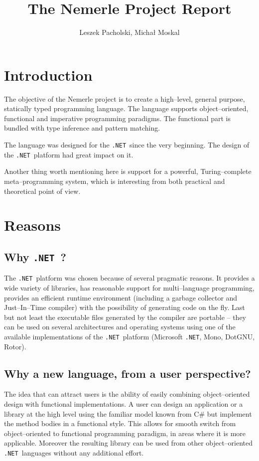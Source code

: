 \documentclass{article}
\title{The Nemerle Project Report}
\author{Leszek Pacholski, Micha{\l} Moskal}
\newcommand{\net}[0]{{\tt .NET}}
\begin{document}
\maketitle

\section{Introduction}

The objective of the Nemerle project is to create a high--level,
general purpose, statically typed programming language. The language supports
object--oriented, functional and imperative programming paradigms.
The functional part is bundled with type inference and pattern matching.

The language was designed for the \net\ since the very beginning.
The design of the \net\ platform had great impact on it.

Another thing worth mentioning here is support for a powerful,
Turing--complete meta--programming system, which is interesting from
both practical and theoretical point of view.

\section{Reasons}

\subsection{Why \net\ ?}

The \net\ platform was chosen because of several
pragmatic reasons. It provides a wide variety of libraries,
has reasonable support for multi--language programming,
provides an efficient runtime environment (including a garbage
collector and Just--In--Time compiler) with the possibility
of generating code on the fly. Last but not least the executable
files generated by the compiler are portable -- they can be used
on several architectures and operating systems using one
of the available implementations of the \net\ platform
(Microsoft \net, Mono, DotGNU, Rotor).

\subsection{Why a new language, from a user perspective?}

The idea that can attract users is the ability of easily
combining object--oriented design with functional implementations.
A user can design an application or a library at the high level using the
familiar model known from C\# but implement the method bodies
in a functional style. This allows for smooth switch from object--oriented
to functional programming paradigm, in areas where it is more applicable.
Moreover the resulting library can be used from other object--oriented
\net\ languages without any additional effort.
\end{document}

